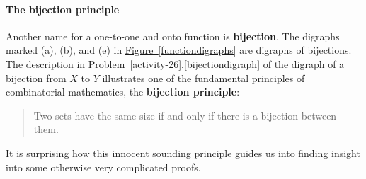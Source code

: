 \documentclass[10pt,]{book}
\newcommand{\terminology}[1]{\textbf{#1}}
\theoremstyle{plain}
\theoremstyle{definition}
\theoremstyle{definition}
\numberwithin{equation}{chapter}
\begin{document}
\paragraph[{The bijection principle}]{The bijection principle}\hypertarget{paragraphs-3}{}
Another name for a one-to-one and onto function is \terminology{bijection}. The digraphs marked (a), (b), and (e) in \hyperref[functiondigraphs]{Figure~\ref{functiondigraphs}} are digraphs of bijections. The description in \hyperref[bijectiondigraph]{Problem~\ref{activity-26}.\ref{bijectiondigraph}} of the digraph of a bijection from \(X\) to \(Y\) illustrates one of the fundamental principles of combinatorial mathematics, the \terminology{bijection principle}:%
\begin{quote}\hypertarget{blockquote-3}{}
Two sets have the same size if and only if there is a bijection between them.%
\end{quote}
It is surprising how this innocent sounding principle guides us into finding insight into some otherwise very complicated proofs.%
\typeout{************************************************}
\typeout{************************************************}
\end{document}

